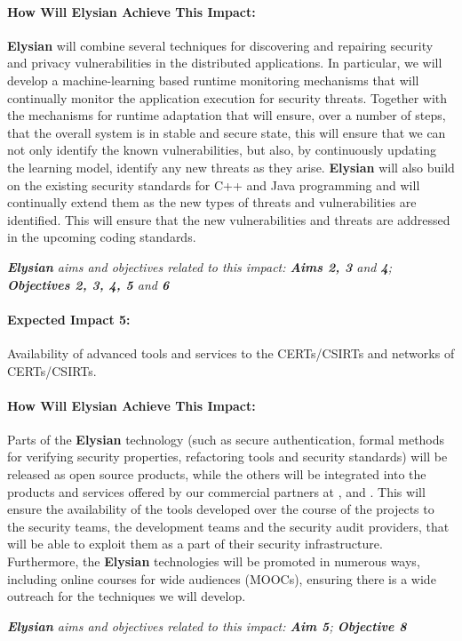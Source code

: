 \documentclass[a4paper,11pt]{article}
\newcommand{\project}[1]{\textbf{#1}\xspace}
\newcommand{\SECURITY}{\project{Elysian}}
\newcommand{\TheProject}{\SECURITY}
\begin{document}
\begin{mdframed}[backgroundcolor=gray!10]
\paragraph{How Will \TheProject{} Achieve This Impact:}
\TheProject{} will combine several techniques for discovering and repairing security and privacy vulnerabilities in the distributed applications. In particular, we will develop a machine-learning based runtime monitoring mechanisms that will continually monitor the application execution for security threats. Together with the mechanisms for runtime adaptation that will ensure, over a number of steps, that the overall system is in stable and secure state, this will ensure that we can not only identify the known vulnerabilities, but also, by continuously updating the learning model, identify any new threats as they arise. \TheProject{} will also build on the existing security standards for C++ and Java programming and will continually extend them as the new types of threats and vulnerabilities are identified. This will ensure that the new vulnerabilities and threats are addressed in the upcoming coding standards. 

\emph{\TheProject{} aims and objectives related to this impact: \textbf{Aims 2, 3}  and \textbf{4}; \textbf{Objectives 2, 3, 4, 5} and \textbf{6} }


\end{mdframed}

\begin{mdframed}[backgroundcolor=blue!5]
\paragraph{Expected Impact 5:}
Availability of advanced tools and services to the CERTs/CSIRTs and networks of CERTs/CSIRTs.
\end{mdframed}

\begin{mdframed}[backgroundcolor=gray!10]
\paragraph{How Will \TheProject{} Achieve This Impact:}
Parts of the \TheProject{} technology (such as secure authentication, formal methods for verifying security properties, refactoring tools and security standards) will be released as open source products, while the others will be integrated into the products and services offered by our commercial partners at \IBMshort{}, \YAGshort{} and \SOPRAshort{}. This will ensure the availability of the tools developed over the course of the projects to the security teams, the development teams and the security audit providers, that will be able to exploit them as a part of their security infrastructure. Furthermore, the \TheProject{} technologies will be promoted in numerous ways, including online courses for wide audiences (MOOCs), ensuring there is a wide outreach for the techniques we will develop.

\emph{\TheProject{} aims and objectives related to this impact: \textbf{Aim 5}; \textbf{Objective 8} }

\end{mdframed}
\end{document}
